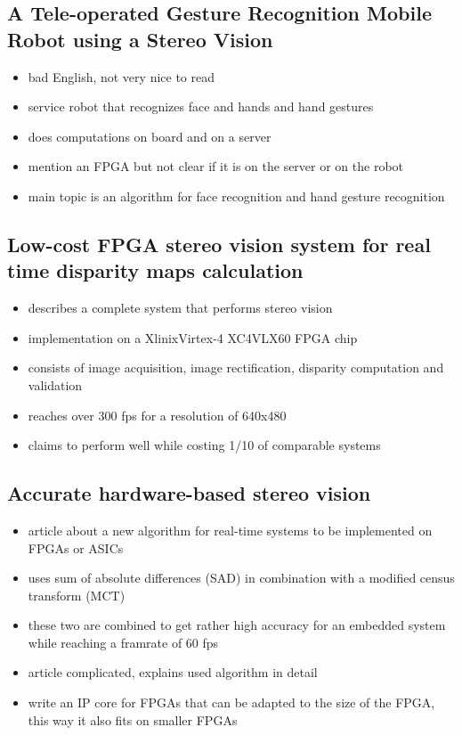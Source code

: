 \subsection{A Tele-operated Gesture Recognition Mobile Robot using a Stereo Vision}
\begin{itemize}
	\item bad English, not very nice to read
	\item service robot that recognizes face and hands and hand gestures
	\item does computations on board and on a server
	\item mention an FPGA but not clear if it is on the server or on the robot
	\item main topic is an algorithm for face recognition and hand gesture recognition
\end{itemize}

\subsection{Low-cost FPGA stereo vision system for real time disparity maps calculation}
\begin{itemize}
	\item describes a complete system that performs stereo vision
	\item implementation on a XlinixVirtex-4 XC4VLX60 FPGA chip
	\item consists of image acquisition, image rectification, disparity computation and validation
	\item reaches over 300 fps for a resolution of 640x480
	\item claims to perform well while costing 1/10 of comparable systems
\end{itemize}

\subsection{Accurate hardware-based stereo vision}
\begin{itemize}
	\item article about a new algorithm for real-time systems to be implemented on FPGAs or ASICs
	\item uses sum of absolute differences (SAD) in combination with a modified census transform (MCT)
	\item these two are combined to get rather high accuracy for an embedded system while reaching a framrate of 60 fps
	\item article complicated, explains used algorithm in detail
	\item write an IP core for FPGAs that can be adapted to the size of the FPGA, this way it also fits on smaller FPGAs
\end{itemize}

